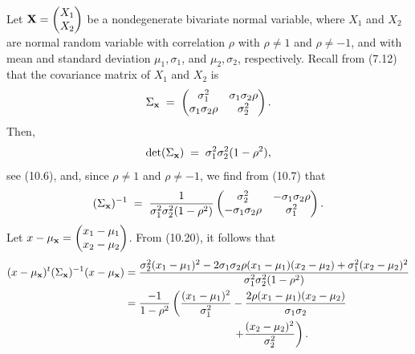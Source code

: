 Let $\mathbf{X} = \begin{pmatrix} X_1 \\ X_2 \end{pmatrix}$ be a nondegenerate bivariate normal
variable, where $X_1$ and $X_2$ are normal random variable with correlation $\rho$ with $\rho
\neq 1$ and $\rho \neq -1$, and with mean and standard deviation $\mu_1, \sigma_1$, and $\mu_2,
\sigma_2$, respectively. Recall from (7.12) that the covariance matrix of $X_1$ and $X_2$ is
\[
\Sigma_{\mathbf{x}} \;=\; \begin{pmatrix} \sigma_1^2 & \sigma_1\sigma_2\rho \\ \sigma_1\sigma_2\rho & \sigma_2^2 \end{pmatrix}.
\]
Then,
\begin{equation}
\det(\Sigma_{\mathbf{x}}) \;=\; \sigma_1^2\sigma_2^2(1-\rho^2),
\end{equation}
see (10.6), and, since $\rho \neq 1$ and $\rho \neq -1$, we find from (10.7) that
\[
(\Sigma_{\mathbf{x}})^{-1} \;=\; \frac{1}{\sigma_1^2\sigma_2^2(1-\rho^2)}
\begin{pmatrix} \sigma_2^2 & -\sigma_1\sigma_2\rho \\ -\sigma_1\sigma_2\rho & \sigma_1^2 \end{pmatrix}.
\]
Let $x-\mu_{\mathbf{x}} = \begin{pmatrix} x_1-\mu_1 \\ x_2-\mu_2 \end{pmatrix}$. From (10.20), it
follows that
\begin{align}
(x-\mu_{\mathbf{x}})^t(\Sigma_{\mathbf{x}})^{-1}(x-\mu_{\mathbf{x}})
&= \frac{\sigma_2^2(x_1-\mu_1)^2 - 2\sigma_1\sigma_2\rho(x_1-\mu_1)(x_2-\mu_2) + \sigma_1^2(x_2-\mu_2)^2}{\sigma_1^2\sigma_2^2(1-\rho^2)} \notag \\
&= \frac{-1}{1-\rho^2}\left(\frac{(x_1-\mu_1)^2}{\sigma_1^2} - \frac{2\rho(x_1-\mu_1)(x_2-\mu_2)}{\sigma_1\sigma_2}\right.\notag\\
&\qquad\qquad\qquad\qquad\qquad \left. + \frac{(x_2-\mu_2)^2}{\sigma_2^2}\right).
\end{align}

